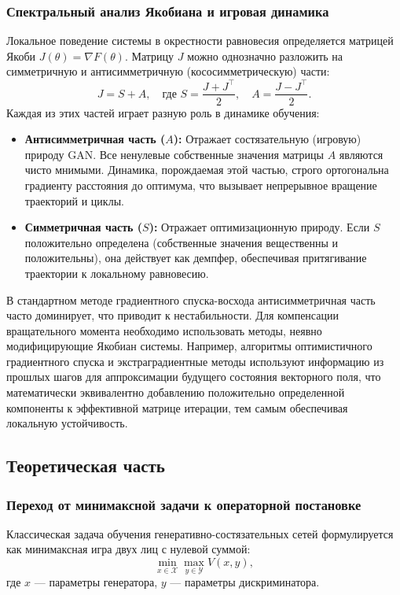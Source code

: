 \documentclass[12pt,a4paper]{article}
\begin{document}
	\subsubsection{Спектральный анализ Якобиана и игровая динамика}
	Локальное поведение системы в окрестности равновесия определяется матрицей Якоби $J(\theta) = \nabla F(\theta)$. Матрицу $J$ можно однозначно разложить на симметричную и антисимметричную (кососимметрическую) части:
	\begin{equation}
		J = S + A, \quad \text{где } S = \frac{J + J^\top}{2}, \quad A = \frac{J - J^\top}{2}.
	\end{equation}
	Каждая из этих частей играет  разную роль в динамике обучения:
	\begin{itemize}
		\item \textbf{Антисимметричная часть ($A$):} Отражает состязательную (игровую) природу GAN. Все ненулевые собственные значения матрицы $A$ являются чисто мнимыми. Динамика, порождаемая этой частью, строго ортогональна градиенту расстояния до оптимума, что вызывает непрерывное вращение траекторий и циклы.
		\item \textbf{Симметричная часть ($S$):} Отражает  оптимизационную природу. Если $S$ положительно определена (собственные значения вещественны и положительны), она действует как демпфер, обеспечивая  притягивание траектории к локальному равновесию.
	\end{itemize}
	В стандартном методе градиентного спуска-восхода антисимметричная часть часто доминирует, что приводит к нестабильности. Для компенсации вращательного момента необходимо использовать методы, неявно модифицирующие Якобиан системы. Например, алгоритмы оптимистичного градиентного спуска и экстраградиентные методы используют информацию из прошлых шагов для аппроксимации будущего состояния векторного поля, что математически эквивалентно добавлению положительно определенной  компоненты к эффективной матрице итерации, тем самым обеспечивая локальную устойчивость.
	

	



	\subsection{Теоретическая часть}
	\subsubsection{Переход от минимаксной задачи к операторной постановке}
	Классическая задача обучения генеративно-состязательных сетей формулируется как минимаксная игра двух лиц с нулевой суммой:
	\begin{equation}
		\min_{x \in \mathcal{X}} \max_{y \in \mathcal{Y}} V(x, y),
	\end{equation}
	где $x$ --- параметры генератора, $y$ --- параметры дискриминатора. 
	
\end{document}
